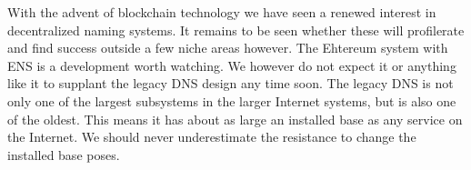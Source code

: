 \documentclass[sigconf]{acmart}
\begin{document}
With the advent of blockchain technology we have seen a renewed interest
in decentralized naming systems.  It remains to be seen whether these
will profilerate and find success outside a few niche areas however.
The Ehtereum system with ENS is a development worth watching.  We
however do not expect it or anything like it to supplant the legacy DNS
design any time soon.  The legacy DNS is not only one of the largest
subsystems in the larger Internet systems, but is also one of the
oldest.  This means it has about as large an installed base as any
service on the Internet.  We should never underestimate the resistance
to change the installed base poses.


\end{document}
